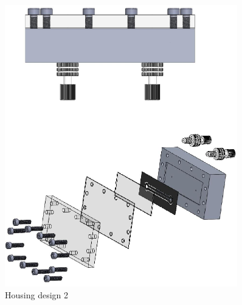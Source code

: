 \begin{figure}[h]%
\centering
\includegraphics[width=0.9\textwidth]{figures/appendix/housingdesign2ass}%
\caption{Housing design 2}%
\label{housingdesign2ass}%
\end{figure}

\clearpage

